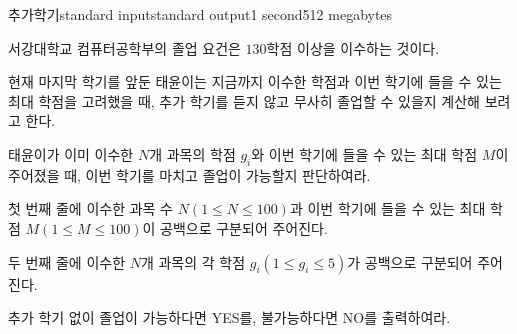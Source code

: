 \begin{problem}{추가학기}{standard input}{standard output}{1 second}{512 megabytes}

서강대학교 컴퓨터공학부의 졸업 요건은 $130$학점 이상을 이수하는 것이다.

현재 마지막 학기를 앞둔 태윤이는 지금까지 이수한 학점과 이번 학기에 들을 수 있는 최대 학점을 고려했을 때, 추가 학기를 듣지 않고 무사히 졸업할 수 있을지 계산해 보려고 한다.

태윤이가 이미 이수한 $N$개 과목의 학점 $g_i$와 이번 학기에 들을 수 있는 최대 학점 $M$이 주어졌을 때, 이번 학기를 마치고 졸업이 가능할지 판단하여라.

\InputFile
첫 번째 줄에 이수한 과목 수 $N(1 \le N \le 100)$과 이번 학기에 들을 수 있는 최대 학점 $M(1 \le M \le 100)$이 공백으로 구분되어 주어진다.

두 번째 줄에 이수한 $N$개 과목의 각 학점 $g_i(1 \le g_i \le 5)$가 공백으로 구분되어 주어진다.

\OutputFile
추가 학기 없이 졸업이 가능하다면 YES를, 불가능하다면 NO를 출력하여라.

\Examples

\begin{example}
%
%
\end{example}

\end{problem}